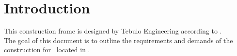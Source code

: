 \section{Introduction}\label{sec:Introduction}
This construction frame is designed by Tebulo Engineering according to \norm .\\
The goal of this document is to outline the requirements and demands of the construction for \project\ located in \location .
